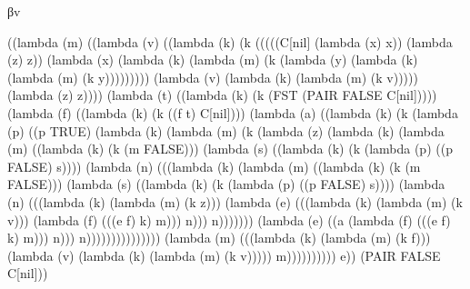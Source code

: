 \documentclass[ms,electronic,twosidetoc,letterpaper,chaptercenter,parttop]{byumsphd}
\begin{document}
\begin{theorem}
βv
\begin{schemedisplay}
((lambda (m) ((lambda (v) ((lambda (k) (k (((((C[nil] (lambda (x) x)) (lambda (z) z))
                           (lambda (x) (lambda (k) (lambda (m) (k (lambda (y) (lambda (k) (lambda (m) (k y)))))))))
                          (lambda (v) (lambda (k) (lambda (m) (k v))))) (lambda (z) z))))
               (lambda (t) ((lambda (k) (k (FST
                                (PAIR FALSE C[nil]))))
                      (lambda (f) ((lambda (k) (k ((f t) C[nil])))
                             (lambda (a) ((lambda (k) (k (lambda (p) ((p TRUE)
                                                    (lambda (k) (lambda (m) (k (lambda (z) (lambda (k) (lambda (m) ((lambda (k) (k (m FALSE)))
                                                                                      (lambda (s) ((lambda (k) (k (lambda (p) ((p FALSE) s))))
                                                                                             (lambda (n) (((lambda (k) (lambda (m) ((lambda (k) (k (m FALSE)))
                                                                                                                  (lambda (s) ((lambda (k) (k (lambda (p) ((p FALSE) s))))
                                                                                                                         (lambda (n) (((lambda (k) (lambda (m) (k z)))
                                                                                                                                 (lambda (e) (((lambda (k) (lambda (m) (k v)))
                                                                                                                                         (lambda (f) (((e f) k) m))) n))) n)))))))
                                                                                                     (lambda (e) ((a (lambda (f) (((e f) k) m))) n))) n)))))))))))))))
                                    (lambda (m) (((lambda (k) (lambda (m) (k f)))
                                            (lambda (v) (lambda (k) (lambda (m) (k v))))) m)))))))))) e))
 (PAIR FALSE C[nil]))
\end{schemedisplay}


\end{theorem}
\end{document}
